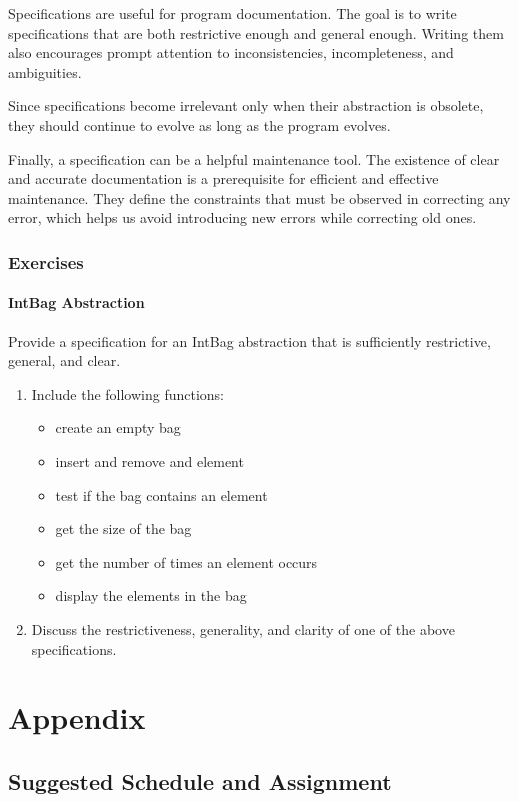 \documentclass[oneside,11pt,dvipsnames]{book}
\begin{document}
Specifications are useful for program documentation. The goal is to write specifications that are both restrictive enough and general enough. Writing them also encourages prompt attention to inconsistencies, incompleteness, and ambiguities.

Since specifications become irrelevant only when their abstraction is obsolete, they should continue to evolve as long as the program evolves.

Finally, a specification can be a helpful maintenance tool. The existence of clear and accurate documentation is a prerequisite for efficient and effective maintenance. They define the constraints that must be observed in correcting any error, which helps us avoid introducing new errors while correcting old ones.

\section{Exercises}
\subsection{IntBag Abstraction}
Provide a specification for an IntBag abstraction that is sufficiently restrictive, general, and clear.
\begin{enumerate}
\item Include the following functions:
\begin{itemize}
    \item create an empty bag
    \item insert and remove and element
    \item test if the bag contains an element
    \item get the size of the bag
    \item get the number of times an element occurs
    \item display the elements in the bag
\end{itemize}
\item Discuss the restrictiveness, generality, and clarity of one of the above specifications.
\end{enumerate}


\part{Appendix}
\appendix

\chapter{Suggested Schedule and Assignment}
\end{document}
